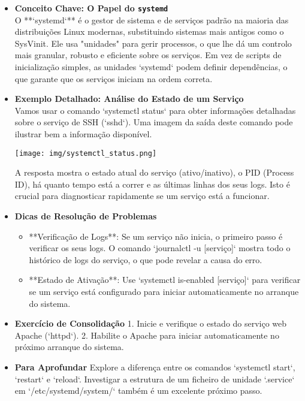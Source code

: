 \documentclass[10pt,a4paper]{article}
\begin{document}
	\begin{itemize}
		\item \textbf{Conceito Chave: O Papel do \texttt{systemd}} \\
		O **`systemd`** é o gestor de sistema e de serviços padrão na maioria das distribuições Linux modernas, substituindo sistemas mais antigos como o SysVinit. Ele usa "unidades" para gerir processos, o que lhe dá um controlo mais granular, robusto e eficiente sobre os serviços. Em vez de scripts de inicialização simples, as unidades `systemd` podem definir dependências, o que garante que os serviços iniciam na ordem correta.
		
		\item \textbf{Exemplo Detalhado: Análise do Estado de um Serviço} \\
		Vamos usar o comando `systemctl status` para obter informações detalhadas sobre o serviço de SSH (`sshd`). Uma imagem da saída deste comando pode ilustrar bem a informação disponível.
		
		\begin{center}
			\texttt{[image: img/systemctl\_status.png]}
		\end{center}
		
		A resposta mostra o estado atual do serviço (ativo/inativo), o PID (Process ID), há quanto tempo está a correr e as últimas linhas dos seus logs. Isto é crucial para diagnosticar rapidamente se um serviço está a funcionar.
		
		\item \textbf{Dicas de Resolução de Problemas}
		\begin{itemize}
			\item **Verificação de Logs**: Se um serviço não inicia, o primeiro passo é verificar os seus logs. O comando `journalctl -u [serviço]` mostra todo o histórico de logs do serviço, o que pode revelar a causa do erro.
			\item **Estado de Ativação**: Use `systemctl is-enabled [serviço]` para verificar se um serviço está configurado para iniciar automaticamente no arranque do sistema.
		\end{itemize}
		
		\item \textbf{Exercício de Consolidação}
		1. Inicie e verifique o estado do serviço web Apache (`httpd`).
		2. Habilite o Apache para iniciar automaticamente no próximo arranque do sistema.
		
		\item \textbf{Para Aprofundar}
		Explore a diferença entre os comandos `systemctl start`, `restart` e `reload`. Investigar a estrutura de um ficheiro de unidade `.service` em `/etc/systemd/system/` também é um excelente próximo passo.
	\end{itemize}
	
\end{document}
